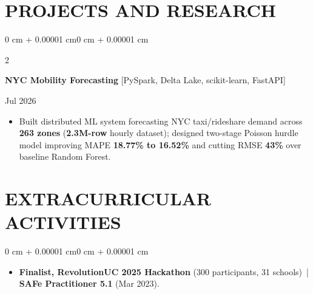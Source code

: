 \documentclass[10pt, letterpaper]{article}
\newenvironment{highlights}{
    \begin{itemize}[
        topsep=0.10 cm,
        parsep=0.06 cm,
        partopsep=0pt,
        itemsep=0.06 cm,
        leftmargin=12pt
    ]
}{
    \end{itemize}
}
\newenvironment{onecolentry}{
    \begin{adjustwidth}{0 cm + 0.00001 cm}{0 cm + 0.00001 cm}
}{
    \end{adjustwidth}
}
\newenvironment{twocolentry}[2][]{
    \onecolentry
    \def\secondColumn{#2}
    \setcolumnwidth{\fill, 4.5 cm}
    \begin{paracol}{2}
}{
    \switchcolumn \raggedleft \secondColumn
    \end{paracol}
    \endonecolentry
}
\begin{document}
\section{PROJECTS AND RESEARCH}
\begin{twocolentry}{Jul 2026}
\textbf{NYC Mobility Forecasting} [PySpark, Delta Lake, scikit-learn, FastAPI]
\end{twocolentry}
\begin{highlights}
  \item Built distributed ML system forecasting NYC taxi/rideshare demand across \textbf{263 zones} (\textbf{2.3M-row} hourly dataset); designed two-stage Poisson hurdle model improving MAPE \textbf{18.77\% to 16.52\%} and cutting RMSE \textbf{43\%} over baseline Random Forest.
\end{highlights}

\section{EXTRACURRICULAR ACTIVITIES}
\begin{onecolentry}
\begin{highlights}
  \item \textbf{Finalist, RevolutionUC 2025 Hackathon} (300 participants, 31 schools) \,|\, \textbf{SAFe Practitioner 5.1} (Mar 2023).
\end{highlights}
\end{onecolentry}
\end{document}
